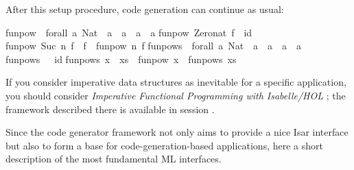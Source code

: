 \begin{isabellebody}
\begin{isamarkuptext}
  After this setup procedure, code generation can continue as usual:%
\end{isamarkuptext}%
\isamarkuptrue%
%
\isadelimquotetypewriter
%
\endisadelimquotetypewriter
%
\isatagquotetypewriter
%
\begin{isamarkuptext}%
funpow\ {\isacharcolon}{\isacharcolon}\ forall\ a{\isachardot}\ Nat\ {\isacharminus}{\isachargreater}\ {\isacharparenleft}a\ {\isacharminus}{\isachargreater}\ a{\isacharparenright}\ {\isacharminus}{\isachargreater}\ a\ {\isacharminus}{\isachargreater}\ a{\isacharsemicolon}\isanewline
funpow\ Zero{\isacharunderscore}nat\ f\ {\isacharequal}\ id{\isacharsemicolon}\isanewline
funpow\ {\isacharparenleft}Suc\ n{\isacharparenright}\ f\ {\isacharequal}\ f\ {\isachardot}\ funpow\ n\ f{\isacharsemicolon}\isanewline
\isanewline
funpows\ {\isacharcolon}{\isacharcolon}\ forall\ a{\isachardot}\ {\isacharbrackleft}Nat{\isacharbrackright}\ {\isacharminus}{\isachargreater}\ {\isacharparenleft}a\ {\isacharminus}{\isachargreater}\ a{\isacharparenright}\ {\isacharminus}{\isachargreater}\ a\ {\isacharminus}{\isachargreater}\ a{\isacharsemicolon}\isanewline
funpows\ {\isacharbrackleft}{\isacharbrackright}\ {\isacharequal}\ id{\isacharsemicolon}\isanewline
funpows\ {\isacharparenleft}x\ {\isacharcolon}\ xs{\isacharparenright}\ {\isacharequal}\ funpow\ x\ {\isachardot}\ funpows\ xs{\isacharsemicolon}\isanewline%
\end{isamarkuptext}%
\isamarkuptrue%
%
\endisatagquotetypewriter
{\isafoldquotetypewriter}%
%
\isadelimquotetypewriter
%
\endisadelimquotetypewriter
%
\isamarkuptrue%
%
\begin{isamarkuptext}%
If you consider imperative data structures as inevitable for a
  specific application, you should consider \emph{Imperative
  Functional Programming with Isabelle/HOL}
  \cite{bulwahn-et-al:2008:imperative}; the framework described there
  is available in session .%
\end{isamarkuptext}%
\isamarkuptrue%
%
\isamarkuptrue%
%
\begin{isamarkuptext}%
Since the code generator framework not only aims to provide a nice
  Isar interface but also to form a base for code-generation-based
  applications, here a short description of the most fundamental ML
  interfaces.%
\end{isamarkuptext}%
\isamarkuptrue%
%

\end{isabellebody}
